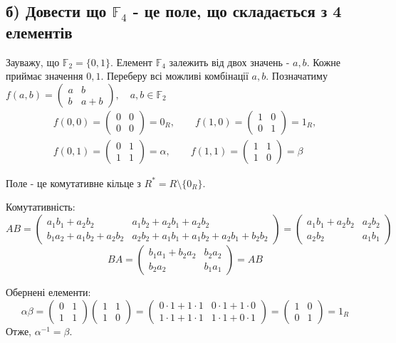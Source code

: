 \documentclass[11pt, a4paper]{article} %
\newcommand{\F}{\mathbb{F}}
\begin{document}
\subsection*{б) Довести що $\F_4$ - це поле, що складається з 4 елементів}
Зауважу, що $\F_2 = \{0,1\}$.
Елемент $\F_4$ залежить від двох значень - $a,b$. Кожне приймає значення $0,1$. Переберу всі можливі комбінації $a,b$.
Позначатиму $f(a,b) = \begin{pmatrix}
    a & b \\ b & a+b
\end{pmatrix}, \quad a,b\in\F_2$
\begin{gather*}
    f(0,0) = \begin{pmatrix}
        0 & 0 \\ 0 & 0
    \end{pmatrix} = 0_R,
    \qquad
    f(1,0) = \begin{pmatrix}
        1 & 0 \\ 0 & 1
    \end{pmatrix} = 1_R,\\
    f(0,1) = \begin{pmatrix}
        0 & 1 \\ 1 & 1
    \end{pmatrix} = \alpha,
    \qquad
    f(1,1) = \begin{pmatrix}
        1 & 1 \\ 1 & 0
    \end{pmatrix} = \beta
\end{gather*}

Поле - це комутативне кільце з $R^* = R\setminus \{0_R\}$.

Комутативність:
\[AB = \begin{pmatrix}
    a_1b_1 + a_2b_2 & a_1b_2 + a_2b_1 + a_2b_2 \\ b_1a_2 + a_1b_2 + a_2b_2 & a_2b_2 + a_1b_1 + a_1b_2 + a_2b_1 + b_2b_2 
\end{pmatrix} = \begin{pmatrix}
    a_1b_1 + a_2b_2 & a_2b_2 \\ a_2b_2 & a_1b_1
\end{pmatrix}\]
\[BA = \begin{pmatrix}
    b_1a_1 + b_2a_2 & b_2a_2 \\ b_2a_2 & b_1a_1
\end{pmatrix} = AB\]

Обернені елементи:
\[\alpha\beta = \begin{pmatrix}
    0 & 1 \\ 1 & 1
\end{pmatrix}\begin{pmatrix}
    1 & 1 \\ 1 & 0
\end{pmatrix} = \begin{pmatrix}
    0\cdot 1 + 1\cdot 1 & 0\cdot 1 + 1\cdot 0 \\
    1\cdot 1 + 1\cdot 1 & 1\cdot 1 + 0\cdot 1
\end{pmatrix} = \begin{pmatrix}
    1 & 0 \\ 0 & 1
\end{pmatrix} = 1_R\]
Отже, $\alpha^{-1} = \beta$.
\end{document}
